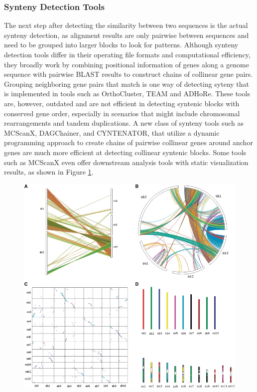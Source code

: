 \subsubsection{Synteny Detection Tools}

The next step after detecting the similarity between two sequences is the actual synteny detection, as alignment results are only pairwise between sequences and need to be grouped into larger blocks to look for patterns. Although synteny detection tools differ in their operating file formats and computational efficiency, they broadly work by combining positional information of genes along a genome sequence with pairwise BLAST results to construct chains of collinear gene pairs. Grouping neighboring gene pairs that match is one way of detecting syteny\cite{wang2012mcscanx} that is implemented in tools such as OrthoCluster\cite{zeng2008orthocluster}, TEAM\cite{luc2003gene} and ADHoRe\cite{proost2011adhore}. These tools are, however, outdated and are not efficient in detecting syntenic blocks with conserved gene order, especially in scenarios that might include chromosomal rearrangements and tandem duplications\cite{wang2012mcscanx}. A new class of synteny tools such as MCScanX\cite{wang2012mcscanx}, DAGChainer\cite{haas2004dagchainer}, and CYNTENATOR\cite{rodelsperger2010cyntenator}, that utilize a dynamic programming approach to create chains of pairwise collinear genes around anchor genes are much more efficient at detecting collinear syntenic blocks. Some tools such as MCScanX even offer downstream analysis tools with static visualization results, as shown in Figure \ref{fig:ch_2_synteny_plots}.     

\begin{figure}
  \centering
  \includegraphics[width=.75\linewidth]{images/ch_2_synteny_plots.jpg}
  \label{fig:ch_2_synteny_plots}
\end{figure}

